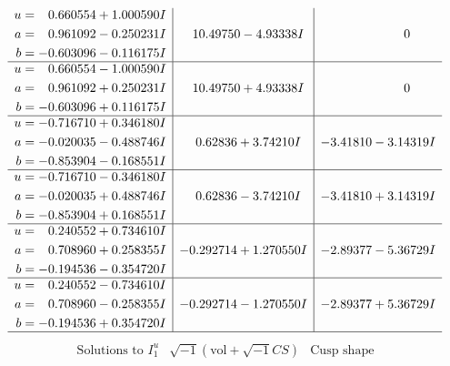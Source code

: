 \documentclass[1p]{elsarticle_modified}
\theoremstyle{definition}
\newcommand{\I}{\sqrt{-1}}
\begin{document}
$$\begin{array}{c|c|c}
\begin{aligned}
u &= \phantom{-}0.660554 + 1.000590 I \\
a &= \phantom{-}0.961092 - 0.250231 I \\
b &= -0.603096 - 0.116175 I\end{aligned}
 & \phantom{-}10.49750 - 4.93338 I & \phantom{-0.000000 } 0 \\ \hline\begin{aligned}
u &= \phantom{-}0.660554 - 1.000590 I \\
a &= \phantom{-}0.961092 + 0.250231 I \\
b &= -0.603096 + 0.116175 I\end{aligned}
 & \phantom{-}10.49750 + 4.93338 I & \phantom{-0.000000 } 0 \\ \hline\begin{aligned}
u &= -0.716710 + 0.346180 I \\
a &= -0.020035 - 0.488746 I \\
b &= -0.853904 - 0.168551 I\end{aligned}
 & \phantom{-}0.62836 + 3.74210 I & -3.41810 - 3.14319 I \\ \hline\begin{aligned}
u &= -0.716710 - 0.346180 I \\
a &= -0.020035 + 0.488746 I \\
b &= -0.853904 + 0.168551 I\end{aligned}
 & \phantom{-}0.62836 - 3.74210 I & -3.41810 + 3.14319 I \\ \hline\begin{aligned}
u &= \phantom{-}0.240552 + 0.734610 I \\
a &= \phantom{-}0.708960 + 0.258355 I \\
b &= -0.194536 - 0.354720 I\end{aligned}
 & -0.292714 + 1.270550 I & -2.89377 - 5.36729 I \\ \hline\begin{aligned}
u &= \phantom{-}0.240552 - 0.734610 I \\
a &= \phantom{-}0.708960 - 0.258355 I \\
b &= -0.194536 + 0.354720 I\end{aligned}
 & -0.292714 - 1.270550 I & -2.89377 + 5.36729 I\\
 \hline 
 \end{array}$$\newpage$$\begin{array}{c|c|c}  
\text{Solutions to }I^u_{1}& \I (\text{vol} + \sqrt{-1}CS) & \text{Cusp shape}\\
 \hline 
\begin{aligned}

\end{aligned}
\end{array}$$
\end{document}
